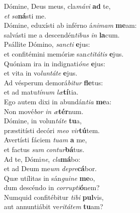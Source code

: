 \evenverse Dómine, Deus meus, cla\textit{má}\textit{vi} \textbf{ad} te,~\*\\
\evenverse \textit{et} \textit{sa}\textbf{ná}sti me.\\
\oddverse Dómine, eduxísti ab inférno á\textit{ni}\textit{mam} \textbf{me}am:~\*\\
\oddverse salvásti me a descendén\textit{ti}\textit{bus} \textit{in} \textbf{la}cum.\\
\evenverse Psállite Dómino, \textit{san}\textit{cti} \textbf{e}jus:~\*\\
\evenverse et confitémini memóriæ san\textit{cti}\textit{tá}\textit{tis} \textbf{e}jus.\\
\oddverse Quóniam ira in indignati\textit{ó}\textit{ne} \textbf{e}jus:~\*\\
\oddverse et vita in vo\textit{lun}\textit{tá}\textit{te} \textbf{e}jus.\\
\evenverse Ad vésperum demorá\textit{bi}\textit{tur} \textbf{fle}tus:~\*\\
\evenverse et ad matu\textit{tí}\textit{num} \textit{læ}\textbf{tí}tia.\\
\oddverse Ego autem dixi in abundán\textit{ti}\textit{a} \textbf{me}a:~\*\\
\oddverse Non mové\textit{bor} \textit{in} \textit{æ}\textbf{tér}num.\\
\evenverse Dómine, in volun\textit{tá}\textit{te} \textbf{tu}a,~\*\\
\evenverse præstitísti decóri \textit{me}\textit{o} \textit{vir}\textbf{tú}tem.\\
\oddverse Avertísti fáciem \textit{tu}\textit{am} \textbf{a} me,~\*\\
\oddverse et factus \textit{sum} \textit{con}\textit{tur}\textbf{bá}tus.\\
\evenverse Ad te, Dómi\textit{ne}, \textit{cla}\textbf{má}bo:~\*\\
\evenverse et ad Deum me\textit{um} \textit{de}\textit{pre}\textbf{cá}bor.\\
\oddverse Quæ utílitas in sán\textit{gui}\textit{ne} \textbf{me}o,~\*\\
\oddverse dum descéndo in \textit{cor}\textit{rup}\textit{ti}\textbf{ó}nem?\\
\evenverse Numquid confitébitur \textit{ti}\textit{bi} \textbf{pul}vis,~\*\\
\evenverse aut annuntiábit ve\textit{ri}\textit{tá}\textit{tem} \textbf{tu}am?\\
